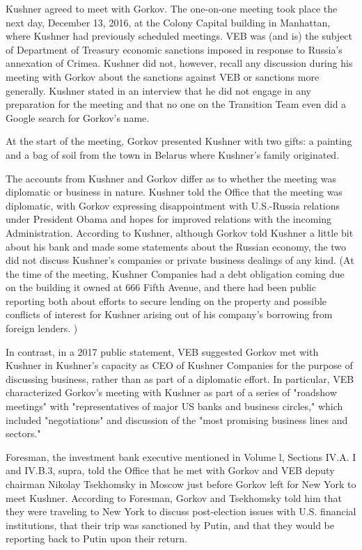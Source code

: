 Kushner agreed to meet with Gorkov.%
The one-on-one meeting took place the next day, December 13, 2016, at the Colony Capital building in Manhattan, where Kushner had previously scheduled meetings.%
VEB was (and is) the subject of Department of Treasury economic sanctions imposed in response to Russia's annexation of Crimea.%
Kushner did not, however, recall any discussion during his meeting with Gorkov about the sanctions against VEB or sanctions more generally.%
Kushner stated in an interview that he did not engage in any preparation for the meeting and that no one on the Transition Team even did a Google search for Gorkov's name.%

At the start of the meeting, Gorkov presented Kushner with two gifts: a painting and a bag of soil from the town in Belarus where Kushner's family originated.%

The accounts from Kushner and Gorkov differ as to whether the meeting was diplomatic or business in nature.
Kushner told the Office that the meeting was diplomatic, with Gorkov expressing disappointment with U.S.-Russia relations under President Obama and hopes for improved relations with the incoming Administration.%
According to Kushner, although Gorkov told Kushner a little bit about his bank and made some statements about the Russian economy, the two did not discuss Kushner's companies or private business dealings of any kind.%
(At the time of the meeting, Kushner Companies had a debt obligation coming due on the building it owned at 666 Fifth Avenue, and there had been public reporting both about efforts to secure lending on the property and possible conflicts of interest for Kushner arising out of his company's borrowing from foreign lenders.%
)

In contrast, in a 2017 public statement, VEB suggested Gorkov met with Kushner in Kushner's capacity as CEO of Kushner Companies for the purpose of discussing business, rather than as part of a diplomatic effort.
In particular, VEB characterized Gorkov's meeting with Kushner as part of a series of "roadshow meetings" with "representatives of major US banks and business circles," which included "negotiations" and discussion of the "most promising business lines and sectors."%

Foresman, the investment bank executive mentioned in Volume l, Sections IV.A. I and IV.B.3, supra, told the Office that he met with Gorkov and VEB deputy chairman Nikolay Tsekhomsky in Moscow just before Gorkov left for New York to meet Kushner.%
According to Foresman, Gorkov and Tsekhomsky told him that they were traveling to New York to discuss post-election issues with U.S. financial institutions, that their trip was sanctioned by Putin, and that they would be reporting back to Putin upon their return.%

